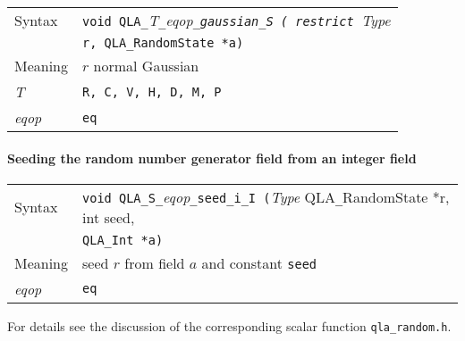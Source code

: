 \documentclass{article}
\newcommand{\tInt}{QLA\ttdash Int }
\newcommand{\tRandomState}{QLA\ttdash RandomState }
\newcommand{\namespace}{QLA}
\newcommand{\allFloatTypes}{{\tt R, C, V, H, D, M, P}}
\newcommand{\ttdash}{{\tt \_}}
\newcommand{\itt}{\it T}
\newcommand{\extraarg}{}
\begin{document}
\begin{flushleft}
  \begin{tabular}{|l|l|}
  \hline
  Syntax      & {\tt void \namespace}\ttdash\itt\ttdash{\it eqop}\ttdash{\tt gaussian}\ttdash{\tt S ( restrict }{\it Type } \\
              & {\tt *r, \tRandomState *a\extraarg)} \\
  \hline
  Meaning     & $r$ normal Gaussian \\
  \hline
  \itt        & \allFloatTypes \\
  \hline
  {\it eqop}  & {\tt eq} \\
  \hline
  \end{tabular}
\end{flushleft}

\paragraph{Seeding the random number generator field from an integer field}

\begin{flushleft}
  \begin{tabular}{|l|l|}
  \hline
  Syntax      & {\tt void \namespace}\ttdash{\tt S}\ttdash{\it eqop}\ttdash{\tt seed}\ttdash{\tt i}\ttdash{\tt I (}{\it Type }{ \tRandomState *r, int seed,}\\
              & {\tt \tInt *a\extraarg)} \\
  \hline
  Meaning     & seed $r$ from field $a$ and constant {\tt seed}\\
  \hline
  {\it eqop}  & {\tt eq} \\
  \hline
  \end{tabular}
\end{flushleft}

For details see the discussion of the corresponding scalar function
{\tt qla}\ttdash{\tt random.h}.
\end{document}
